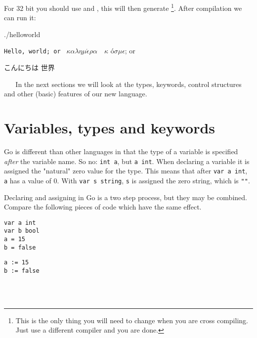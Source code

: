 \noindent{}For 32 bit you should use  and , this will then
generate  \footnote{This is the only thing you will
need to change when you are cross compiling. Just use a different
compiler and you are done.}.
After compilation we can run it:
\begin{display}
\pr ./helloworld
\end{display}\texttt{Hello, world; or }%
\begin{math}\kappa\alpha\lambda\eta\mu\acute{\epsilon}\rho\alpha\hspace{1em}\kappa\end{math}%
\'o\begin{math} \sigma\mu\epsilon\end{math}; or \begin{cjk}こんにちは 世界\end{cjk}
\ \newline
\ \newline
In the next sections we will look at the types, keywords, control structures
and other (basic) features of our new language. 

\section{Variables, types and keywords}
Go is different than other languages in that the type of a variable
is specified \emph{after} the variable name. So no: 
\lstinline{int a}, but \lstinline{a int}. When declaring a variable it
is assigned the "natural" zero value for the type. This means that after
\lstinline{var a int}, \lstinline{a} has a value of $0$. With
\lstinline{var s string}, \lstinline{s} is assigned the zero string,
which is \lstinline{""}. 

Declaring and assigning in Go is a two step process, but they may
be combined. Compare the following pieces of code which have
the same effect.

\begin{minipage}{.5\textwidth}
\begin{lstlisting}[linewidth=.5\textwidth,caption=Using \texttt{=}]
var a int
var b bool
a = 15
b = false
\end{lstlisting}
\hfill
\end{minipage}
\begin{minipage}{.5\textwidth}
\begin{lstlisting}[linewidth=.5\textwidth,caption=Using \texttt{:=}]
a := 15
b := false
\end{lstlisting}
\ \\
\ \\
\hfill
\end{minipage}

